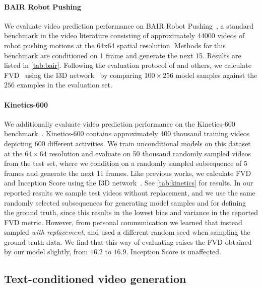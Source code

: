 \paragraph{BAIR Robot Pushing}

We evaluate video prediction performance on BAIR Robot Pushing~\citep{ebert2017self}, a standard benchmark in the video literature consisting of approximately 44000 videos of robot pushing motions at the 64x64 spatial resolution. Methods for this benchmark are conditioned on 1 frame and generate the next 15. Results are listed in \ref{tab:bair}. Following the evaluation protocol of \cite{babaeizadeh2021fitvid} and others, we calculate FVD~\citep{unterthiner2018towards} using the I3D network~\citep{carreira2017quo} by comparing $100 \times 256$ model samples against the $256$ examples in the evaluation set.

\paragraph{Kinetics-600}
We additionally evaluate video prediction performance on the Kinetics-600 benchmark~\citep{kay2017kinetics,carreira2018short}. Kinetics-600 contains approximately 400 thousand training videos depicting 600 different activities. We train unconditional models on this dataset at the $64 \times 64$ resolution and evaluate on 50 thousand randomly sampled videos from the test set, where we condition on a randomly sampled subsequence of 5 frames and generate the next 11 frames. Like previous works, we calculate FVD and Inception Score using the I3D network~\citep{carreira2017quo}. See \ref{tab:kinetics} for results. In our reported results we sample test videos without replacement, and we use the same randomly selected subsequences for generating model samples and for defining the ground truth, since this results in the lowest bias and variance in the reported FVD metric. However, from personal communication we learned that \citep{luc2020transformation,clark2019adversarial} instead sampled \emph{with replacement}, and used a different random seed when sampling the ground truth data. We find that this way of evaluating raises the FVD obtained by our model slightly, from $16.2$ to $16.9$. Inception Score is unaffected.

\subsection{Text-conditioned video generation}
\label{sec:text_to_video_experiments}

